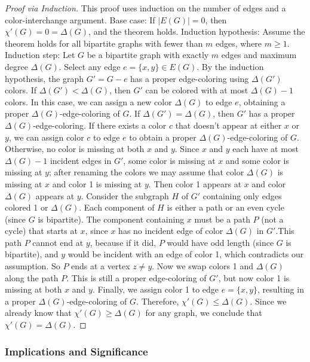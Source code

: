 \documentclass{article}
\theoremstyle{definition}
\begin{document}
\begin{proof}[Proof via Induction]
This proof uses induction on the number of edges and a color-interchange argument. Base case: If $|E(G)| = 0$, then $\chi'(G) = 0 = \Delta(G)$, and the theorem holds. Induction hypothesis: Assume the theorem holds for all bipartite graphs with fewer than $m$ edges, where $m \geq 1$. Induction step: Let $G$ be a bipartite graph with exactly $m$ edges and maximum degree $\Delta(G)$. Select any edge $e = \{x, y\} \in E(G)$. By the induction hypothesis, the graph $G' = G - e$ has a proper edge-coloring using $\Delta(G')$ colors. If $\Delta(G') < \Delta(G)$, then $G'$ can be colored with at most $\Delta(G) - 1$ colors. In this case, we can assign a new color $\Delta(G)$ to edge $e$, obtaining a proper $\Delta(G)$-edge-coloring of $G$. If $\Delta(G') = \Delta(G)$, then $G'$ has a proper $\Delta(G)$-edge-coloring. If there exists a color $c$ that doesn't appear at either $x$ or $y$, we can assign color $c$ to edge $e$ to obtain a proper $\Delta(G)$-edge-coloring of $G$. Otherwise, no color is missing at both $x$ and $y$. Since $x$ and $y$ each have at most $\Delta(G)-1$ incident edges in $G'$, some color is missing at $x$ and some color is missing at $y$; after renaming the colors we may assume that color $\Delta(G)$ is missing at $x$ and color 1 is missing at $y$. Then color 1 appears at $x$ and color $\Delta(G)$ appears at $y$. Consider the subgraph $H$ of $G'$ containing only edges colored 1 or $\Delta(G)$. Each component of $H$ is either a path or an even cycle (since $G$ is bipartite). The component containing $x$ must be a path $P$ (not a cycle) that starts at $x$, since $x$ has no incident edge of color $\Delta(G)$ in $G'$.This path $P$ cannot end at $y$, because if it did, $P$ would have odd length (since $G$ is bipartite), and $y$ would be incident with an edge of color 1, which contradicts our assumption. So $P$ ends at a vertex $z \neq y$. Now we swap colors 1 and $\Delta(G)$ along the path $P$. This is still a proper edge-coloring of $G'$, but now color 1 is missing at both $x$ and $y$. Finally, we assign color 1 to edge $e = \{x, y\}$, resulting in a proper $\Delta(G)$-edge-coloring of $G$. Therefore, $\chi'(G) \leq \Delta(G)$. Since we already know that $\chi'(G) \geq \Delta(G)$ for any graph, we conclude that $\chi'(G) = \Delta(G)$.
\end{proof}

\subsubsection{Implications and Significance}
\end{document}
